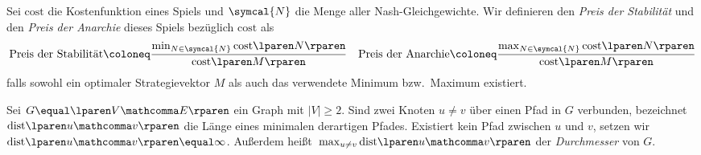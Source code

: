 \begin{definition}
\label{def:pds_pda}
  Sei $\mathrm{cost}$ die Kostenfunktion eines Spiels
  und $\symcal{N}$ die Menge aller Nash-Gleichgewichte.
  Wir definieren den \emph{Preis der Stabilität}
  und den \emph{Preis der Anarchie} dieses Spiels bezüglich $\mathrm{cost}$ als
  \[
    \text{Preis der Stabilität}
    \coloneq
    \frac{\min_{ N \in \symcal{N} } \cost{ N }}{\cost{M}}
    \quad
    \text{Preis der Anarchie}
    \coloneq
    \frac{\max_{ N \in \symcal{N} } \cost{ N }}{\cost{M}}
  \]
  falls sowohl ein optimaler Strategievektor $M$
  als auch das verwendete Minimum bzw.\ Maximum existiert.
\end{definition}

\begin{definition}
\label{def:dist}
  Sei $G \equal \lparen V \mathcomma E \rparen$ ein Graph
  mit $\vert V \vert \geq 2$.
  Sind zwei Knoten $u \ne v$ über einen Pfad in $G$ verbunden,
  bezeichnet $\dist{u}{v}$ die Länge eines minimalen derartigen Pfades.
  Existiert kein Pfad zwischen $u$ und $v$,
  setzen wir $\dist{u}{v} \equal \infty$.
  Außerdem heißt~$\max_{ u \ne v } \dist{u}{v}$
  der \emph{Durchmesser} von $G$.
\end{definition}
